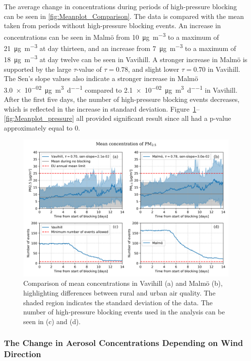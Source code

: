 The average change in \PM concentrations during periods of high-pressure blocking can be seen in \autoref{fig:Meanplot_Comparison}. The data is compared with the \PM mean taken from periods without high-pressure blocking events. An increase in \PM concentrations can be seen in Malmö from \SI{10}{\micro\gram\per\meter\cubed} to a maximum of \SI{21}{\micro\gram\per\meter\cubed} at day thirteen, and an increase from \SI{7}{\micro\gram\per\meter\cubed} to a maximum of \SI{18}{\micro\gram\per\meter\cubed} at day twelve can be seen in Vavihill. A stronger increase in Malmö is supported by the large $\tau$-value of $\tau=0.78$, and slight lower $\tau=0.70$ in Vavihill. The Sen's slope values also indicate a stronger increase in Malmö \SI{3.0e-02}{\micro\gram\per\meter\cubed\per\day} compared to \SI{2.1e-02}{\micro\gram\per\meter\cubed\per\day} in Vavihill. After the first five days, the number of high-pressure blocking events decreases, which is reflected in the increase in standard deviation. Figure~\ref{fig:Meanplot_Comparison}--\ref{fig:Meanplot_pressure} all provided significant result since all had a p-value approximately equal to 0.


\begin{figure}[H]
    \centering
    \includegraphics[width=\textwidth]{Figures/Meanplot.png}
    \caption{Comparison of mean \PM  concentrations in Vavihill (a) and Malmö (b), highlighting differences between rural and urban air quality. The shaded region indicates the standard deviation of the data. The number of high-pressure blocking events used in the analysis can be seen in (c) and (d).}
    \label{fig:Meanplot_Comparison}
\end{figure}

\subsubsection{The Change in Aerosol Concentrations Depending on Wind Direction}

